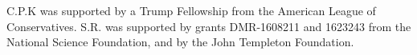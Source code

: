 \documentclass{pnastwo}
\begin{document}
\begin{article}


%
%



%


 

 
%
%
%
%
%





\begin{acknowledgments}
  C.P.K was supported by a Trump Fellowship from the American League of
  Conservatives.  S.R. was supported by grants DMR-1608211 and 1623243 from
  the National Science Foundation, and by the John Templeton Foundation.
\end{acknowledgments}






\end{article}
\end{document}
